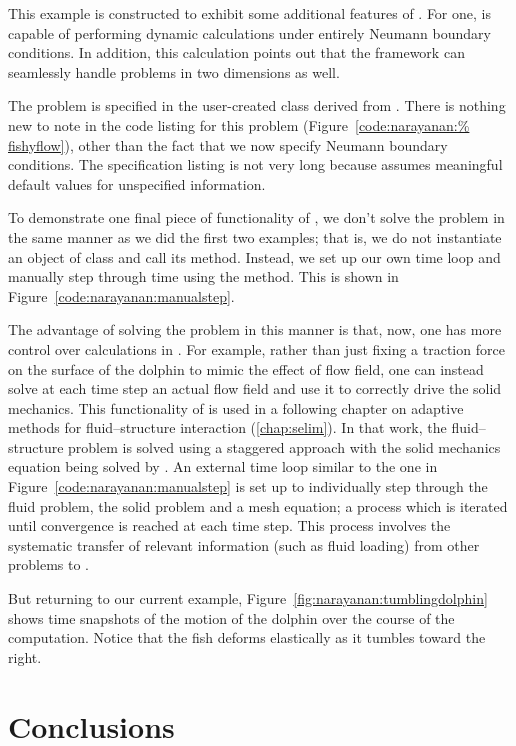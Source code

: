 This example is constructed to exhibit some additional features of
\twist. For one, \twist{} is capable of performing dynamic calculations
under entirely Neumann boundary conditions. In addition, this
calculation points out that the framework can seamlessly handle
problems in two dimensions as well.

The problem is specified in the user-created class 
derived from . There is nothing new to note in
the code listing for this problem (Figure~\ref{code:narayanan:%
fishyflow}), other than the fact that we now specify Neumann boundary
conditions. The specification listing is not very long because
\twist{} assumes meaningful default values for unspecified
information.

To demonstrate one final piece of functionality of \twist, we don't
solve the problem in the same manner as we did the first two examples;
that is, we do not instantiate an object of class  and
call its  method. Instead, we set up our own time loop
and manually step through time using the  method. This is
shown in Figure~\ref{code:narayanan:manualstep}.

The advantage of solving the problem in this manner is that, now, one
has more control over calculations in \twist{}. For example, rather
than just fixing a traction force on the surface of the dolphin to
mimic the effect of flow field, one can instead solve at each time
step an actual flow field and use it to correctly drive the solid
mechanics. This functionality of \twist{} is used in a following
chapter on adaptive methods for fluid--structure interaction
(\ref{chap:selim}). In that work, the fluid--structure problem is
solved using a staggered approach with the solid mechanics equation
being solved by \twist. An external time loop similar to the one in
Figure~\ref{code:narayanan:manualstep} is set up to individually step
through the fluid problem, the solid problem and a mesh equation; a
process which is iterated until convergence is reached at each time
step. This process involves the systematic transfer of relevant
information (such as fluid loading) from other problems to \twist.

But returning to our current example,
Figure~\ref{fig:narayanan:tumblingdolphin} shows time snapshots of the
motion of the dolphin over the course of the computation. Notice that
the fish deforms elastically as it tumbles toward the right.

\section{Conclusions}

